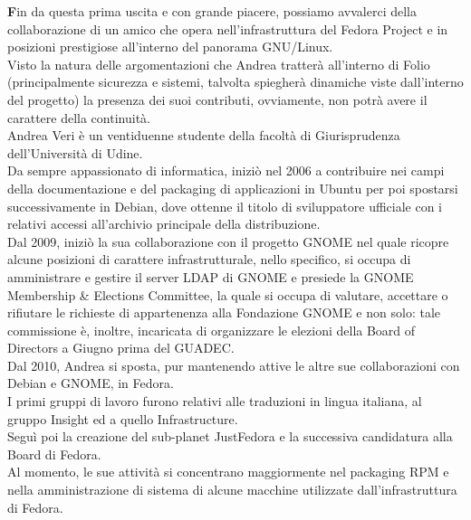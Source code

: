 \onehalfspacing
\lettrine[lines=1, loversize=0.1, lraise=0.1]{\color[cmyk]{0.5, 0, 1, 0}\bfseries F}{}in da questa prima uscita e con grande piacere, possiamo avvalerci della collaborazione di un amico che opera nell'infrastruttura del Fedora Project e in posizioni prestigiose all'interno del panorama GNU/Linux.\\ 

Visto la natura delle argomentazioni che Andrea tratterà all'interno di Folio (principalmente sicurezza e sistemi, talvolta spiegherà dinamiche viste dall'interno del progetto) la presenza dei suoi contributi, ovviamente, non potrà avere il carattere della continuità.\\

Andrea Veri è un ventiduenne studente della facoltà di Giurisprudenza dell'Università di Udine.\\

Da sempre appassionato di informatica, iniziò nel 2006 a contribuire nei campi della documentazione e del packaging di applicazioni in Ubuntu per poi spostarsi successivamente in Debian, dove ottenne il titolo di sviluppatore ufficiale con i relativi accessi all'archivio principale della distribuzione.\\

Dal 2009, iniziò la sua collaborazione con il progetto GNOME nel quale ricopre alcune posizioni di carattere infrastrutturale, nello specifico, si occupa di amministrare e gestire il server LDAP di GNOME e presiede la GNOME Membership \& Elections Committee, la quale si occupa di valutare, accettare o rifiutare le richieste di appartenenza alla Fondazione GNOME e non solo: tale commissione è, inoltre, incaricata di organizzare le elezioni della Board of Directors a Giugno prima del GUADEC.\\

Dal 2010, Andrea si sposta, pur mantenendo attive le altre sue collaborazioni con Debian e GNOME, in Fedora.\\

I primi gruppi di lavoro furono relativi alle traduzioni in lingua italiana, al gruppo Insight ed a quello Infrastructure.\\

Seguì poi la creazione del sub-planet JustFedora e la successiva candidatura alla Board di Fedora.\\

Al momento, le sue attività si concentrano maggiormente nel packaging RPM e nella amministrazione di sistema di alcune macchine utilizzate dall'infrastruttura di Fedora.\\